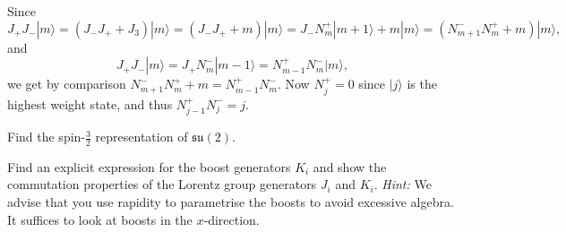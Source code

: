 \documentclass[notes.tex]{subfiles}
\begin{document}
\begin{Answer} 
Since 
\[ J_+J_-|m\rangle=(J_- J_++J_3) |m\rangle=(J_- J_++m) |m\rangle=J_- N_m^+|m+1\rangle+m |m\rangle=(N_{m+1}^-N_m^++m) |m\rangle, \]
and
\[ J_+J_-|m\rangle=J_+N_m^-|m-1\rangle= N_{m-1}^+N_m^-|m\rangle, \]
we get by comparison $N_{m+1}^-N_m^++m=N_{m-1}^+N_m^-$. Now $N_j^+=0$ since $|j\rangle$ is the highest weight state, and thus $N_{j-1}^+N_j^-=j$.
\end{Answer}


\begin{Exercise}[]
Find the spin-$\frac{3}{2}$ representation of $\mathfrak{su}(2)$.
\end{Exercise}


\begin{Exercise}[label=ex:boost_generators]
Find an explicit expression for the boost generators $K_i$ and show the commutation properties of the Lorentz group generators $J_i$ and $K_i$. {\it Hint:} We advise that you use rapidity to parametrise the boosts to avoid excessive algebra. It suffices to look at boosts in the $x$-direction.
\end{Exercise}
\end{document}

